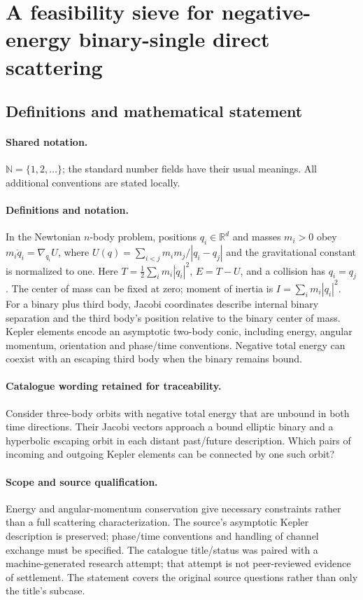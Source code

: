\documentclass[11pt]{article}
\begin{document}
\section{A feasibility sieve for negative-energy binary-single direct scattering}\label{statement}

\subsection{Definitions and mathematical statement}

\paragraph{Shared notation.}$\mathbb N=\{1,2,\ldots\}$; the standard number fields have their usual meanings. All additional conventions are stated locally.


\paragraph{Definitions and notation.}In the Newtonian $n$-body problem, positions $q_i\in\mathbb R^d$ and masses $m_i>0$ obey $m_i\ddot q_i=\nabla_{q_i}U$, where $U(q)=\sum_{i<j}m_im_j/|q_i-q_j|$ and the gravitational constant is normalized to one. Here $T=\tfrac12\sum_i m_i|\dot q_i|^2$, $E=T-U$, and a collision has $q_i=q_j$. The center of mass can be fixed at zero; moment of inertia is $I=\sum_i m_i|q_i|^2$. For a binary plus third body, Jacobi coordinates describe internal binary separation and the third body’s position relative to the binary center of mass. Kepler elements encode an asymptotic two-body conic, including energy, angular momentum, orientation and phase/time conventions. Negative total energy can coexist with an escaping third body when the binary remains bound.

\paragraph{Catalogue wording retained for traceability.}
Consider three-body orbits with negative total energy that are unbound in both time directions. Their Jacobi vectors approach a bound elliptic binary and a hyperbolic escaping orbit in each distant past/future description. Which pairs of incoming and outgoing Kepler elements can be connected by one such orbit?
\paragraph{Scope and source qualification.}Energy and angular-momentum conservation give necessary constraints rather than a full scattering characterization. The source’s asymptotic Kepler description is preserved; phase/time conventions and handling of channel exchange must be specified. The catalogue title/status was paired with a machine-generated research attempt; that attempt is not peer-reviewed evidence of settlement. The statement covers the original source questions rather than only the title’s subcase.
\end{document}
